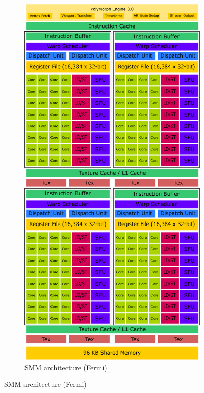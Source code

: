 \begin{figure}[p]
\begin{subfigure}{0.49\textwidth}
  \includegraphics[width=1\linewidth]{img/SMMArchitecture.eps}
  \caption{SMM architecture (Fermi)}
  \label{fig:smmarchitecture}
\end{subfigure}
\vspace*{0.1cm} 

\end{figure}
